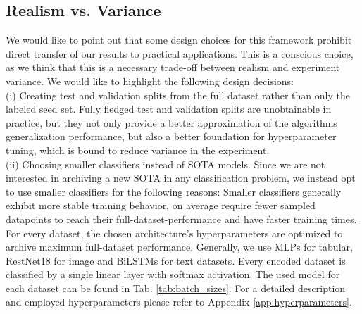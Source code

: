 \documentclass[]{article}
\begin{document}
\subsection{Realism vs. Variance}\label{sec:realism}
We would like to point out that some design choices for this framework prohibit direct transfer of our results to practical applications. 
This is a conscious choice, as we think that this is a necessary trade-off between realism and experiment variance.
We would like to highlight the following design decisions: \\
(i) Creating test and validation splits from the full dataset rather than only the labeled seed set. Fully fledged test and validation splits are unobtainable in practice, but they not only provide a better approximation of the algorithms generalization performance, but also a better foundation for hyperparameter tuning, which is bound to reduce variance in the experiment. \\
(ii) Choosing smaller classifiers instead of SOTA models. Since we are not interested in archiving a new SOTA in any classification problem, we instead opt to use smaller classifiers for the following reasons:
Smaller classifiers generally exhibit more stable training behavior, on average require fewer sampled datapoints to reach their full-dataset-performance and have faster training times.
For every dataset, the chosen architecture's hyperparameters are optimized to archive maximum full-dataset performance.
Generally, we use MLPs for tabular, RestNet18 for image and BiLSTMs for text datasets.
Every encoded dataset is classified by a single linear layer with softmax activation.
The used model for each dataset can be found in Tab. \ref{tab:batch_sizes}.
For a detailed description and employed hyperparameters please refer to Appendix \ref{app:hyperparameters}.


\end{document}

